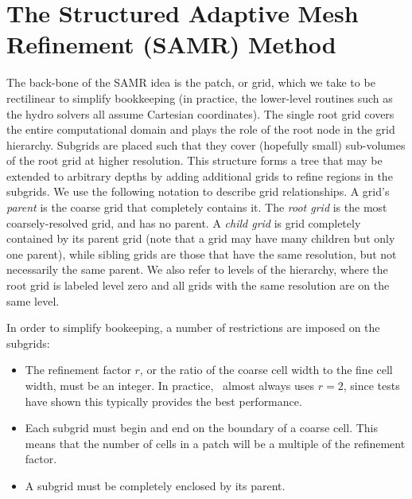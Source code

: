 \section{The Structured Adaptive Mesh Refinement (SAMR) Method}
\label{sec.amr}



The back-bone of the SAMR idea is the patch, or grid, which we take to be rectilinear to simplify bookkeeping (in practice, the lower-level routines such as the hydro solvers all assume Cartesian coordinates).  The single root grid covers the entire computational domain and plays the role of the root node in the grid hierarchy.  Subgrids are placed such that they cover (hopefully small) sub-volumes of the root grid at higher resolution.  This structure forms a tree that may be extended to arbitrary depths by adding additional grids to refine regions in the subgrids.  We use the following notation to describe grid relationships.  A grid's \textit{parent} is the coarse grid that completely contains it.  The \textit{root grid} is the most coarsely-resolved grid, and has no parent.  A \textit{child grid} is grid completely contained by its parent grid (note that a grid may have many children but only one parent), while sibling grids are those that have the same resolution, but not necessarily the same parent.  We also refer to levels of the hierarchy, where the root grid is labeled level zero and all grids with the same resolution are on the
same level.

In order to simplify bookeeping, a number of restrictions are imposed on the subgrids:
\begin{itemize}
 \item The refinement factor $r$, or the ratio of the coarse cell width to the fine cell width, must be an integer.  In practice, \enzo\ almost always uses $r=2$, since tests have shown this typically provides the best performance.
 \item Each subgrid must begin and end on the boundary of a coarse cell.  This means that the number of cells in a patch will be a multiple of the refinement factor.
 \item A subgrid must be completely enclosed by its parent.
\end{itemize}

